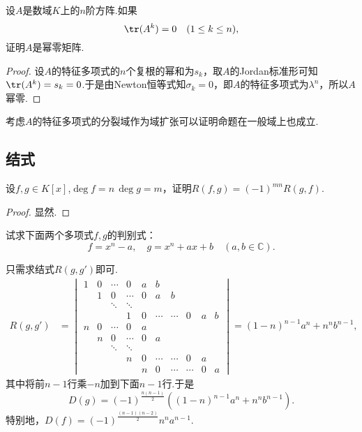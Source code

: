 \begin{prob}[14]
	设$A$是数域$K$上的$n$阶方阵.如果
	\[
		\tr(A^k)=0\quad(1\le k\le n),
	\]
	证明$A$是幂零矩阵.
\end{prob}
\begin{proof}
	设$A$的特征多项式的$n$个复根的幂和为$s_k$，取$A$的Jordan标准形可知$\tr(A^k)=s_k=0$.于是由Newton恒等式知$\sigma_k=0$，即$A$的特征多项式为$\lambda^n$，所以$A$幂零.
\end{proof}
\begin{note}
	考虑$A$的特征多项式的分裂域作为域扩张可以证明命题在一般域上也成立.
\end{note}
\subsection{结式}
\begin{prob}[1]
	设$f,g\in K[x]$,$\deg f=n\,\deg g=m$，证明$R(f,g)=(-1)^{mn}R(g,f)$.
\end{prob}
\begin{proof}
	显然.
\end{proof}
\begin{prob}[2]
	试求下面两个多项式$f,g$的判别式：
	\[
		f=x^n-a,\quad g=x^n+ax+b\quad(a,b\in\mathbb{C}).
	\]
\end{prob}
\begin{sol}
	只需求结式$R(g,g')$即可.
	\begin{align*}
		R(g,g') & =\begin{vmatrix}
			1 & 0 & \cdots & 0      & a & b      &        &        &   &   \\
			  & 1 & 0      & \cdots & 0 & a      & b      &        &   &   \\
			  &   & \ddots & \ddots &   &        &        &        &   &   \\
			  &   &        & 1      & 0 & \cdots & \cdots & 0      & a & b \\
			n & 0 & \cdots & 0      & a &        &        &        &   &   \\
			  & n & 0      & \cdots & 0 & a      &        &        &   &   \\
			  &   & \ddots & \ddots &   &        &        &        &   &   \\
			  &   &        & n      & 0 & \cdots & \cdots & 0      & a &   \\
			  &   &        &        & n & 0      & \cdots & \cdots & 0 & a
		\end{vmatrix}=(1-n)^{n-1}a^n+n^nb^{n-1},
	\end{align*}
	其中将前$n-1$行乘$-n$加到下面$n-1$行.于是
	\[
		D(g)=(-1)^{\frac{n(n-1)}{2}}((1-n)^{n-1}a^n+n^nb^{n-1}).
	\]
	特别地，$D(f)=(-1)^{\frac{(n-1)(n-2)}{2}}n^na^{n-1}$.
\end{sol}
